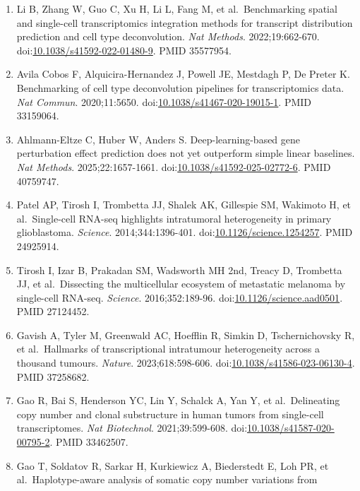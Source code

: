 \documentclass[11pt]{article}
\begin{document}
\begin{enumerate}
\item
  Li B, Zhang W, Guo C, Xu H, Li L, Fang M, et al.~Benchmarking spatial
  and single-cell transcriptomics integration methods for transcript
  distribution prediction and cell type deconvolution. \emph{Nat
  Methods}. 2022;19:662-670.
  doi:\href{https://doi.org/10.1038/s41592-022-01480-9}{10.1038/s41592-022-01480-9}.
  PMID 35577954.
\item
  Avila Cobos F, Alquicira-Hernandez J, Powell JE, Mestdagh P, De Preter
  K. Benchmarking of cell type deconvolution pipelines for
  transcriptomics data. \emph{Nat Commun}. 2020;11:5650.
  doi:\href{https://doi.org/10.1038/s41467-020-19015-1}{10.1038/s41467-020-19015-1}.
  PMID 33159064.
\item
  Ahlmann-Eltze C, Huber W, Anders S. Deep-learning-based gene
  perturbation effect prediction does not yet outperform simple linear
  baselines. \emph{Nat Methods}. 2025;22:1657-1661.
  doi:\href{https://doi.org/10.1038/s41592-025-02772-6}{10.1038/s41592-025-02772-6}.
  PMID 40759747.
\item
  Patel AP, Tirosh I, Trombetta JJ, Shalek AK, Gillespie SM, Wakimoto H,
  et al.~Single-cell RNA-seq highlights intratumoral heterogeneity in
  primary glioblastoma. \emph{Science}. 2014;344:1396-401.
  doi:\href{https://doi.org/10.1126/science.1254257}{10.1126/science.1254257}.
  PMID 24925914.
\item
  Tirosh I, Izar B, Prakadan SM, Wadsworth MH 2nd, Treacy D, Trombetta
  JJ, et al.~Dissecting the multicellular ecosystem of metastatic
  melanoma by single-cell RNA-seq. \emph{Science}. 2016;352:189-96.
  doi:\href{https://doi.org/10.1126/science.aad0501}{10.1126/science.aad0501}.
  PMID 27124452.
\item
  Gavish A, Tyler M, Greenwald AC, Hoefflin R, Simkin D, Tschernichovsky
  R, et al.~Hallmarks of transcriptional intratumour heterogeneity
  across a thousand tumours. \emph{Nature}. 2023;618:598-606.
  doi:\href{https://doi.org/10.1038/s41586-023-06130-4}{10.1038/s41586-023-06130-4}.
  PMID 37258682.
\item
  Gao R, Bai S, Henderson YC, Lin Y, Schalck A, Yan Y, et
  al.~Delineating copy number and clonal substructure in human tumors
  from single-cell transcriptomes. \emph{Nat Biotechnol}.
  2021;39:599-608.
  doi:\href{https://doi.org/10.1038/s41587-020-00795-2}{10.1038/s41587-020-00795-2}.
  PMID 33462507.
\item
  Gao T, Soldatov R, Sarkar H, Kurkiewicz A, Biederstedt E, Loh PR, et
  al.~Haplotype-aware analysis of somatic copy number variations from

\end{enumerate}
\end{document}
